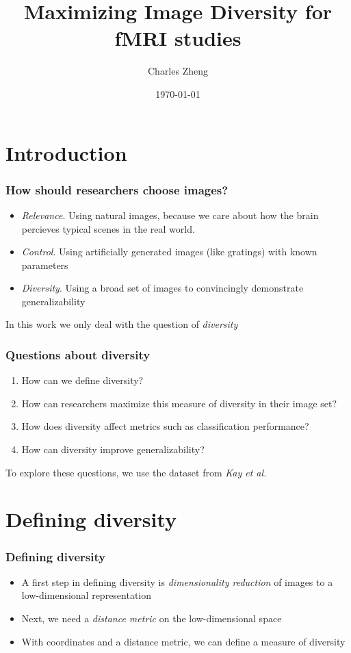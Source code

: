 \documentclass{beamer}
\title[Experimental Design Project]{Maximizing Image Diversity for fMRI studies}
\author{Charles Zheng} %
\institute[Stanford] %
{Stanford University}
\date{\today} %
\begin{document}
\begin{frame}
\titlepage %
\end{frame}

\section{Introduction}

\begin{frame}
\frametitle{How should researchers choose images?}
\begin{itemize}
\item \emph{Relevance}. Using natural images, because we care about how the brain percieves typical scenes in the real world.
\item \emph{Control}. Using artificially generated images (like gratings) with known parameters
\item \emph{Diversity}. Using a broad set of images to convincingly demonstrate generalizability
\end{itemize}
In this work we only deal with the question of \emph{diversity}
\end{frame}

\begin{frame}
\frametitle{Questions about diversity}
\begin{enumerate}
\item How can we define diversity?
\item How can researchers maximize this measure of diversity in their image set?
\item How does diversity affect metrics such as classification performance?
\item How can diversity improve generalizability?
\end{enumerate}

To explore these questions, we use the dataset from \emph{Kay et al.}
\end{frame}

\section{Defining diversity}

\frame{\sectionpage}

\begin{frame}
\frametitle{Defining diversity}
\begin{itemize}
\item A first step in defining diversity is \emph{dimensionality reduction} of images to a low-dimensional representation
\item Next, we need a \emph{distance metric} on the low-dimensional space
\item With coordinates and a distance metric, we can define a measure of diversity
\end{itemize}
\end{frame}
\end{document}
